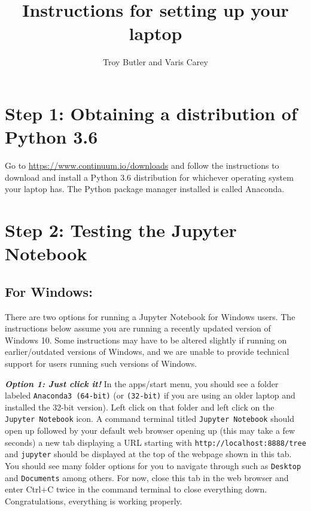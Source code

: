 \documentclass{amsart}
\theoremstyle{plain}
\theoremstyle{definition}
\theoremstyle{remark}
\theoremstyle{definition}
\numberwithin{equation}{section}
\numberwithin{equation}{section}
\begin{document}
\title{Instructions for setting up your laptop}
\author{Troy Butler and Varis Carey}

\maketitle

\section*{Step 1: Obtaining a distribution of Python 3.6}

Go to \href{https://www.continuum.io/downloads}{https://www.continuum.io/downloads} and follow the instructions to download and install a Python 3.6 distribution for whichever operating system your laptop has. 
The Python package manager installed is called Anaconda. 

\section*{Step 2: Testing the Jupyter Notebook}

\subsection*{For Windows:}

There are two options for running a Jupyter Notebook for Windows users.
The instructions below assume you are running a recently updated version of Windows 10.
Some instructions may have to be altered slightly if running on earlier/outdated versions of Windows, and we are unable to provide technical support for users running such versions of Windows.


{\bf \em Option 1: Just click it!}
In the apps/start menu, you should see a folder labeled \verb|Anaconda3 (64-bit)| (or \verb|(32-bit)| if you are using an older laptop and installed the 32-bit version). 
Left click on that folder and left click on the \verb|Jupyter Notebook| icon.
A command terminal titled \verb|Jupyter Notebook| should open up followed by your default web browser opening up (this may take a few seconds) a new tab displaying a URL starting with \verb|http://localhost:8888/tree| and \verb|jupyter| should be displayed at the top of the webpage shown in this tab. 
You should see many folder options for you to navigate through such as \verb|Desktop| and \verb|Documents| among others. 
For now, close this tab in the web browser and enter Ctrl+C twice in the command terminal to close everything down.
Congratulations, everything is working properly. 
\end{document}
